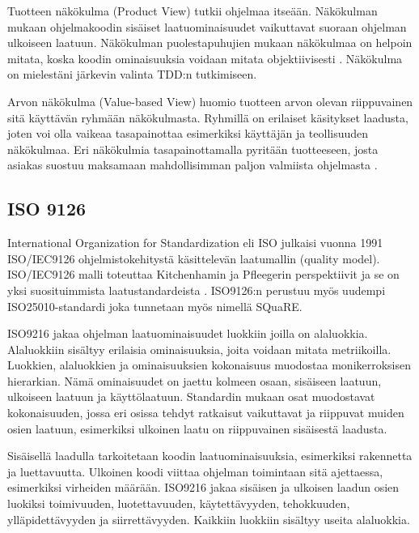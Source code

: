 \documentclass[finnish]{tktltiki2}
\theoremstyle{definition}
\theoremstyle{remark}
\begin{document}
Tuotteen näkökulma (Product View) tutkii ohjelmaa itseään. Näkökulman mukaan ohjelmakoodin sisäiset laatuominaisuudet vaikuttavat suoraan ohjelman ulkoiseen laatuun. Näkökulman puolestapuhujien mukaan näkökulmaa on helpoin mitata, koska koodin ominaisuuksia voidaan mitata objektiivisesti \cite{Kitchenham96}. Näkökulma on mielestäni järkevin valinta TDD:n tutkimiseen.

Arvon näkökulma (Value-based View) huomio tuotteen arvon olevan riippuvainen sitä käyttävän ryhmään näkökulmasta. Ryhmillä on erilaiset käsitykset laadusta, joten voi olla vaikeaa tasapainottaa esimerkiksi käyttäjän ja teollisuuden näkökulmaa. Eri näkökulmia tasapainottamalla pyritään tuotteeseen, josta asiakas suostuu maksamaan mahdollisimman paljon valmiista ohjelmasta \cite{Kitchenham96}.  

\subsection{ISO 9126}

International Organization for Standardization eli ISO julkaisi vuonna 1991 ISO/IEC9126 ohjelmistokehitystä käsittelevän laatumallin (quality model). \cite{ISO9126}  ISO/IEC9126 malli toteuttaa Kitchenhamin ja Pfleegerin perspektiivit \cite{Cote07}  ja se on yksi suosituimmista laatustandardeista \cite{Botella04}. ISO9126:n perustuu myös uudempi ISO25010-standardi joka tunnetaan myös nimellä SQuaRE. \cite{ISO2011}

 ISO9216 jakaa ohjelman laatuominaisuudet luokkiin joilla on alaluokkia. Alaluokkiin sisältyy erilaisia ominaisuuksia, joita voidaan mitata metriikoilla. Luokkien, alaluokkien ja ominaisuuksien kokonaisuus muodostaa monikerroksisen hierarkian.\cite{Miguel14} Nämä ominaisuudet on jaettu kolmeen osaan, sisäiseen laatuun, ulkoiseen laatuun ja käyttölaatuun. Standardin mukaan osat muodostavat kokonaisuuden, jossa eri osissa tehdyt ratkaisut vaikuttavat ja riippuvat muiden osien laatuun, esimerkiksi ulkoinen laatu on riippuvainen sisäisestä laadusta.



Sisäisellä laadulla tarkoitetaan koodin laatuominaisuuksia, esimerkiksi rakennetta ja luettavuutta. Ulkoinen koodi viittaa ohjelman toimintaan sitä ajettaessa, esimerkiksi virheiden määrään. ISO9216 jakaa sisäisen ja ulkoisen laadun osien luokiksi toimivuuden, luotettavuuden, käytettävyyden, tehokkuuden, ylläpidettävyyden ja siirrettävyyden. Kaikkiin luokkiin sisältyy useita alaluokkia.
\end{document}
